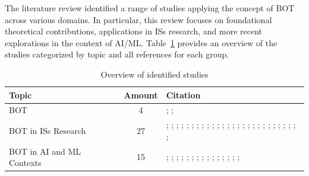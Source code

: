 \documentclass[12pt,oneside]{article}
\begin{document}
The literature review identified a range of studies applying the concept of \ac{BOT} across various domains. In particular, this review focuses on foundational theoretical contributions, applications in \ac{IS}s research, and more recent explorations in the context of \ac{AI}/\ac{ML}. Table~\ref{tab:overview-identified-studies} provides an overview of the studies categorized by topic and all references for each group.

\begin{table}[ht]
    \centering
    \small
    \caption{Overview of identified studies}
        \begin{tabular}{ l c p{8cm} } 
        \toprule
        \textbf{Topic} & \textbf{Amount} & \textbf{Citation} \\
        \midrule
        \ac{BOT} & 4 & \citealp{carlile2002pragmatic}; \citealp{abraham2013enterprise} \citealp{star1989institutional}; \citealp{gal2008dynamics} \\
        \midrule
        \ac{BOT} in \ac{IS}s Research & 27 & \citealp{folmer2014method}; \citealp{vanlooy2024theoretical}; \citealp{rosenkranz2014boundary}; \citealp{gantman2011boundary}; \citealp{fominykh2016boundary}; \citealp{huvila2017boundary}; \citealp{petrik2020boundary}; \citealp{mccarthy2020building}; \citealp{bakhaev2023cocreating}; \citealp{johansson2013cocreation}; \citealp{hsiao2012collaborative}; \citealp{gantman2014communication}; \citealp{corsaro2018crossing}; \citealp{steger2018ecosystem}; \citealp{elo2024enabling}; \citealp{ghazawneh2010governing}; \citealp{weeger2017artefacts}; \citealp{gasson2021managing}; \citealp{marheineke2016importance}; \citealp{abson2014ecosystem}; \citealp{koskinen2005metaphoric}; \citealp{petrik2021exploring}; \citealp{marheineke2016bridging}; \citealp{gasson2005resolving}; \citealp{jentsch2014shared}; \citealp{doolin2012sociomateriality}; \citealp{pawlowski2000supporting}; \\
        \midrule
        \ac{BOT} in \ac{AI} and \ac{ML} Contexts & 15 & \citealp{alter2021new}; \citealp{prentice2023artificial}; \citealp{chung2023artinter}; \citealp{rahlmeier2024bridging}; \citealp{krafft2020challenges}; \citealp{zebhauser2023entrepreneurial}; \citealp{yang2018investigating}; \citealp{veletsianos2024artificial}; \citealp{ayobi2021machine}; \citealp{mayer2023managing}; \citealp{cai2021onboarding}; \citealp{särner2024prospective}; \citealp{strübing1998bridging}; \citealp{kot2020concept}; \citealp{wilson2023learning};  \\
        \bottomrule
    \end{tabular}
    \label{tab:overview-identified-studies}
\end{table}
\end{document}
